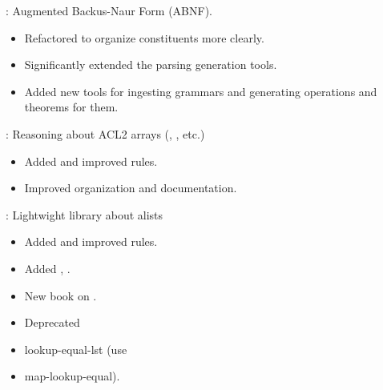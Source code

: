 \begin{frame}

\implibtitle

:
Augmented Backus-Naur Form (ABNF).
\begin{itemize}
\item Refactored to organize constituents more clearly.
\item Significantly extended the parsing generation tools.
\item Added new tools for ingesting grammars
      and generating operations and theorems for them.
\end{itemize}

\end{frame}


\begin{frame}

\implibtitle

:
Reasoning about ACL2 arrays (, , etc.)
\begin{itemize}
\item Added and improved rules.
\item Improved organization and documentation.
\end{itemize}

\end{frame}


\begin{frame}

\implibtitle

:
Lightwight library about alists
\begin{itemize}
\item Added and improved rules.
\item Added , .
\item New book on .
\item Deprecated \item{lookup-equal-lst} (use \item{map-lookup-equal}).
\end{itemize}

\end{frame}


